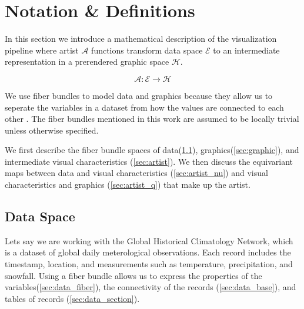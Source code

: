 \documentclass[../main.tex]{subfiles}
\begin{document}
\section{Notation \& Definitions}

In this section we introduce a mathematical description of the visualization pipeline where artist $\mathscr{A}$ functions transform data space $\mathscr{E}$ to an intermediate representation in a prerendered graphic space $\mathscr{H}$. 

\begin{equation}
    \label{eq:artist}
    \mathscr{A}: \mathscr{E} \rightarrow \mathscr{H}
\end{equation}

We use fiber bundles\cite{FiberBundle2020, rowlandFiberBundle} to model data and graphics because they allow us to seperate the variables in a dataset from how the values  are connected to each other \cite{butlerVisualizationModelBased1989,butlerVectorBundleClassesForm1992}. The fiber bundles mentioned in this work are assumed to be locally trivial\cite{spanier1989algebraic,LocallyTrivialFibre} unless otherwise specified. 

We first describe the fiber bundle spaces of data(\ref{sec:data}), graphics(\ref{sec:graphic}), and intermediate visual characteristics (\ref{sec:artist}). We then discuss the equivariant maps between data and visual characteristics (\ref{sec:artist_nu}) and visual characteristics and graphics (\ref{sec:artist_q}) that make up the artist.

\subsection{Data Space}
\label{sec:data}
Lets say we are working with the Global Historical Climatology Network\cite{AnOverviewoftheGlobalHistoricalClimatologyNetworkDailyDatabase}, which is a dataset of global daily meterological observations. Each record includes the timestamp, location, and measurements such as temperature, precipitation, and snowfall. Using a fiber bundle allows us to express the properties of the variables(\ref{sec:data_fiber}), the connectivity of the records (\ref{sec:data_base}), and tables of records (\ref{sec:data_section}).
\end{document}
